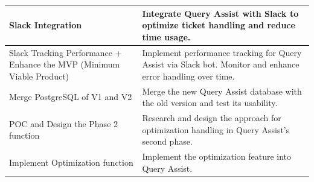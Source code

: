 \begin{table}[H]
\begin{tabular}{|p{4cm}|p{10cm}|}
            \hline
            Slack Integration & Integrate Query Assist with Slack to optimize ticket handling and reduce time usage. \\
            \hline
            Slack Tracking Performance + Enhance the MVP (Minimum Viable Product) & Implement performance tracking for Query Assist via Slack bot. Monitor and enhance error handling over time. \\
            \hline
            Merge PostgreSQL of V1 and V2 & Merge the new Query Assist database with the old version and test its usability. \\
            \hline
            POC and Design the Phase 2 function & Research and design the approach for optimization handling in Query Assist's second phase. \\
            \hline
            Implement Optimization function & Implement the optimization feature into Query Assist. \\
            \hline
        \end{tabular}
    \end{table}
\pagebreak
